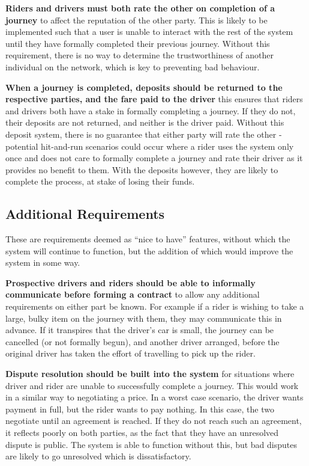 \bigskip\textbf{Riders and drivers must both rate the other on completion of a journey} to affect the reputation of the other party. This is likely to be implemented such that a user is unable to interact with the rest of the system until they have formally completed their previous journey. Without this requirement, there is no way to determine the trustworthiness of another individual on the network, which is key to preventing bad behaviour.

\bigskip\textbf{When a journey is completed, deposits should be returned to the respective parties, and the fare paid to the driver} this ensures that riders and drivers both have a stake in formally completing a journey. If they do not, their deposits are not returned, and neither is the driver paid. Without this deposit system, there is no guarantee that either party will rate the other - potential hit-and-run scenarios could occur where a rider uses the system only once and does not care to formally complete a journey and rate their driver as it provides no benefit to them. With the deposits however, they are likely to complete the process, at stake of losing their funds.


\subsection{Additional Requirements}

These are requirements deemed as \enquote{nice to have} features, without which the system will continue to function, but the addition of which would improve the system in some way.

\bigskip\textbf{Prospective drivers and riders should be able to informally communicate before forming a contract} to allow any additional requirements on either part be known. For example if a rider is wishing to take a large, bulky item on the journey with them, they may communicate this in advance. If it transpires that the driver's car is small, the journey can be cancelled (or not formally begun), and another driver arranged, before the original driver has taken the effort of travelling to pick up the rider.

\bigskip\textbf{Dispute resolution should be built into the system} for situations where driver and rider are unable to successfully complete a journey. This would work in a similar way to negotiating a price. In a worst case scenario, the driver wants payment in full, but the rider wants to pay nothing. In this case, the two negotiate until an agreement is reached. If they do not reach such an agreement, it reflects poorly on both parties, as the fact that they have an unresolved dispute is public. The system is able to function without this, but bad disputes are likely to go unresolved which is dissatisfactory.

